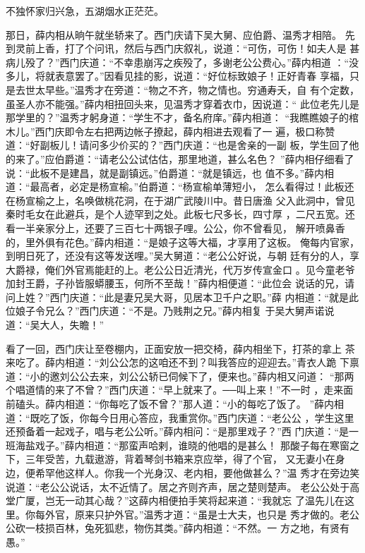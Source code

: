 不独怀家归兴急，五湖烟水正茫茫。

那日，薛内相从晌午就坐轿来了。西门庆请下吴大舅、应伯爵、温秀才相陪。
先到灵前上香，打了个问讯，然后与西门庆叙礼，说道：“可伤，可伤！如夫人是
甚病儿殁了？”西门庆道：“不幸患崩泻之疾殁了，多谢老公公费心。”薛内相道
：“没多儿，将就表意罢了。”因看见挂的影，说道：“好位标致娘子！正好青春
享福，只是去世太早些。”温秀才在旁道：“物之不齐，物之情也。穷通寿夭，自
有个定数，虽圣人亦不能强。”薛内相扭回头来，见温秀才穿着衣巾，因说道：“
此位老先儿是那学里的？”温秀才躬身道：“学生不才，备名府庠。”薛内相道：
“我瞧瞧娘子的棺木儿。”西门庆即令左右把两边帐子撩起，薛内相进去观看了一
遍，极口称赞道：“好副板儿！请问多少价买的？”西门庆道：“也是舍亲的一副
板，学生回了他的来了。”应伯爵道：“请老公公试估估，那里地道，甚么名色？
”薛内相仔细看了说：“此板不是建昌，就是副镇远。”伯爵道：“就是镇远，也
值不多。”薛内相道：“最高者，必定是杨宣榆。”伯爵道：“杨宣榆单薄短小，
怎么看得过！此板还在杨宣榆之上，名唤做桃花洞，在于湖广武陵川中。昔日唐渔
父入此洞中，曾见秦时毛女在此避兵，是个人迹罕到之处。此板七尺多长，四寸厚
，二尺五宽。还看一半亲家分上，还要了三百七十两银子哩。公公，你不曾看见，
解开喷鼻香的，里外俱有花色。”薛内相道：“是娘子这等大福，才享用了这板。
俺每内官家，到明日死了，还没有这等发送哩。”吴大舅道：“老公公好说，与朝
廷有分的人，享大爵禄，俺们外官焉能赶的上。老公公日近清光，代万岁传宣金口
。见今童老爷加封王爵，子孙皆服蟒腰玉，何所不至哉！”薛内相便道：“此位会
说话的兄，请问上姓？”西门庆道：“此是妻兄吴大哥，见居本卫千户之职。”薛
内相道：“就是此位娘子令兄么？”西门庆道：“不是。乃贱荆之兄。”薛内相复
于吴大舅声诺说道：“吴大人，失瞻！”

看了一回，西门庆让至卷棚内，正面安放一把交椅，薛内相坐下，打茶的拿上
茶来吃了。薛内相道：“刘公公怎的这咱还不到？叫我答应的迎迎去。”青衣人跪
下禀道：“小的邀刘公公去来，刘公公轿已伺候下了，便来也。”薛内相又问道：
“那两个唱道情的来了不曾？”西门庆道：“早上就来了。──叫上来！”不一时
，走来面前磕头。薛内相道：“你每吃了饭不曾？”那人道：“小的每吃了饭了。
”薛内相道：“既吃了饭，你每今日用心答应，我重赏你。”西门庆道：“老公公
，学生这里还预备着一起戏子，唱与老公公听。”薛内相问：“是那里戏子？”西
门庆道：“是一班海盐戏子。”薛内相道：“那蛮声哈剌，谁晓的他唱的是甚么！
那酸子每在寒窗之下，三年受苦，九载遨游，背着琴剑书箱来京应举，得了个官，
又无妻小在身边，便希罕他这样人。你我一个光身汉、老内相，要他做甚么？”温
秀才在旁边笑说道：“老公公说话，太不近情了。居之齐则齐声，居之楚则楚声。
老公公处于高堂广厦，岂无一动其心哉？”这薛内相便拍手笑将起来道：“我就忘
了温先儿在这里。你每外官，原来只护外官。”温秀才道：“虽是士大夫，也只是
秀才做的。老公公砍一枝损百林，兔死狐悲，物伤其类。”薛内相道：“不然。一
方之地，有贤有愚。”

